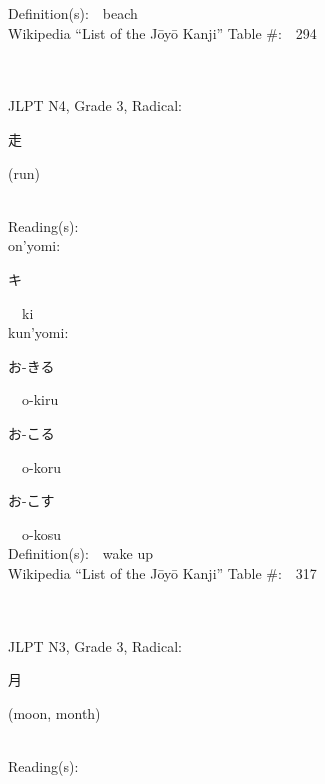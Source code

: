 \begin{multicols}{2}
Definition(s):\ \ beach \\
Wikipedia ``List of the J\=oy\=o Kanji'' Table \#:\ \ 294 \\
\ \ \\
{\fontsize{34pt}{40pt}  }\ \ \\  %
{JLPT N4, Grade 3, Radical:\ \ {\begin{CJK}{UTF8}{min} 走 \end{CJK}} (run) } \\
Reading(s):\ \ \\
{\hspace*{1em}}on'yomi:\ \ \\
{\hspace*{2em}}{\begin{CJK}{UTF8}{min} キ \end{CJK}}\ \ ki\ \ \\
{\hspace*{1em}}kun'yomi:\ \ \\
{\hspace*{2em}}{\begin{CJK}{UTF8}{min} お-きる \end{CJK}}\ \ o-kiru\ \ \\
{\hspace*{2em}}{\begin{CJK}{UTF8}{min} お-こる \end{CJK}}\ \ o-koru\ \ \\
{\hspace*{2em}}{\begin{CJK}{UTF8}{min} お-こす \end{CJK}}\ \ o-kosu\ \ \\
Definition(s):\ \ wake up \\
Wikipedia ``List of the J\=oy\=o Kanji'' Table \#:\ \ 317 \\
\ \ \\
{\fontsize{34pt}{40pt}  }\ \ \\  %
{JLPT N3, Grade 3, Radical:\ \ {\begin{CJK}{UTF8}{min} 月 \end{CJK}} (moon, month) } \\
Reading(s):\ \ \\

\end{multicols}
